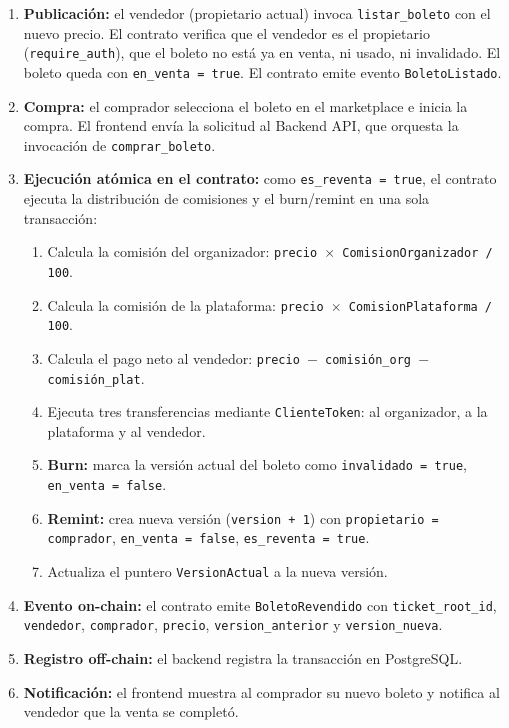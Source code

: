\documentclass[12pt,oneside]{article}
\begin{document}
\begin{enumerate}
  \item \textbf{Publicación:} el vendedor (propietario actual) invoca \texttt{listar\_boleto} con el nuevo precio. El contrato verifica que el vendedor es el propietario (\texttt{require\_auth}), que el boleto no está ya en venta, ni usado, ni invalidado. El boleto queda con \texttt{en\_venta = true}. El contrato emite evento \texttt{BoletoListado}.
  \item \textbf{Compra:} el comprador selecciona el boleto en el marketplace e inicia la compra. El frontend envía la solicitud al Backend API, que orquesta la invocación de \texttt{comprar\_boleto}.
  \item \textbf{Ejecución atómica en el contrato:} como \texttt{es\_reventa = true}, el contrato ejecuta la distribución de comisiones y el burn/remint en una sola transacción:
    \begin{enumerate}[label=\alph*)]
      \item Calcula la comisión del organizador: \texttt{precio $\times$ ComisionOrganizador / 100}.
      \item Calcula la comisión de la plataforma: \texttt{precio $\times$ ComisionPlataforma / 100}.
      \item Calcula el pago neto al vendedor: \texttt{precio $-$ comisión\_org $-$ comisión\_plat}.
      \item Ejecuta tres transferencias mediante \texttt{ClienteToken}: al organizador, a la plataforma y al vendedor.
      \item \textbf{Burn:} marca la versión actual del boleto como \texttt{invalidado = true}, \texttt{en\_venta = false}.
      \item \textbf{Remint:} crea nueva versión (\texttt{version + 1}) con \texttt{propietario = comprador}, \texttt{en\_venta = false}, \texttt{es\_reventa = true}.
      \item Actualiza el puntero \texttt{VersionActual} a la nueva versión.
    \end{enumerate}
  \item \textbf{Evento on-chain:} el contrato emite \texttt{BoletoRevendido} con \texttt{ticket\_root\_id}, \texttt{vendedor}, \texttt{comprador}, \texttt{precio}, \texttt{version\_anterior} y \texttt{version\_nueva}.
  \item \textbf{Registro off-chain:} el backend registra la transacción en PostgreSQL.
  \item \textbf{Notificación:} el frontend muestra al comprador su nuevo boleto y notifica al vendedor que la venta se completó.
\end{enumerate}
\end{document}
